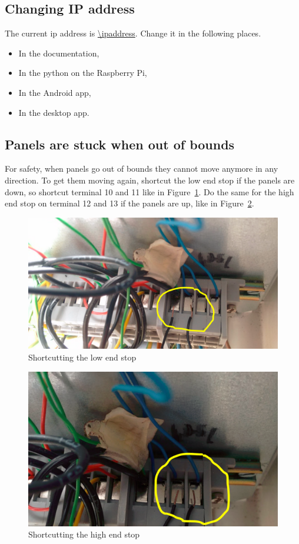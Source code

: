 \subsection{Changing IP address}\label{subsec:changingIpAddress}

The current ip address is \url{\ipaddress}.
Change it in the following places.
\begin{itemize}
    \item In the documentation,
    \item In the python on the Raspberry Pi,
    \item In the Android app,
    \item In the desktop app.
\end{itemize}

\subsection{Panels are stuck when out of bounds}\label{subsec:outOfBounds}

For safety, when panels go out of bounds they cannot move anymore in any direction.
To get them moving again, shortcut the low end stop if the panels are down, so shortcut terminal 10 and 11 like in Figure~\ref{lowendstop}.
Do the same for the high end stop on terminal 12 and 13 if the panels are up, like in Figure~\ref{highendstop}.


\begin{figure}
    \centering
    \includegraphics[width=.8\linewidth]{images/lowendstop.PNG}
    \caption{Shortcutting the low end stop}
    \label{lowendstop}
\end{figure}
\begin{figure}
    \centering
    \includegraphics[width=.8\linewidth]{images/highendstop.PNG}
    \caption{Shortcutting the high end stop}
    \label{highendstop}
\end{figure}